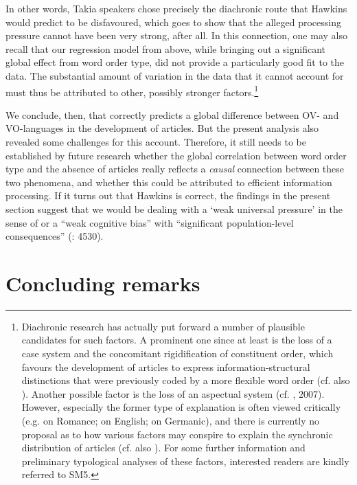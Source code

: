 \documentclass[output=paper]{langsci/langscibook}
\begin{document}
In other words, Takia speakers chose precisely the diachronic route that Hawkins would predict to be disfavoured, which goes to show that the alleged processing pressure cannot have been very strong, after all. In this connection, one may also recall that our regression model from above, while bringing out a significant global effect from word order type, did not provide a particularly good fit to the data. The substantial amount of variation in the data that it cannot account for must thus be attributed to other, possibly stronger factors.\footnote{Diachronic research has actually put forward a number of plausible candidates for such factors. A prominent one since at least \citet{Vennemann1975} is the loss of a case system and the concomitant rigidification of constituent order, which favours the development of articles to express information-structural distinctions that were previously coded by a more flexible word order (cf. also \citealt{Hawkins2004,HewsonBubenik2006,Fischer2010,CarlierLamiroy2014}). Another possible factor is the loss of an aspectual system (cf. \citealt{Abraham1997,Leiss2000}, 2007). However, especially the former type of explanation is often viewed critically (e.g. \citealt{Selig1992} on Romance;  \citealt{McCollMillar2000} on English; \citealt{Leiss2000} on Germanic), and there is currently no proposal as to how various factors may conspire to explain the synchronic distribution of articles (cf. also \citealt{Lüdtke1991}). For some further information and preliminary typological analyses of these factors, interested readers are kindly referred to SM5.}

We conclude, then, that \citet{Hawkins2014} correctly predicts a global difference between OV- and VO-languages in the development of articles. But the present analysis also revealed some challenges for this account. Therefore, it still needs to be established by future research whether the global correlation between word order type and the absence of articles really reflects a \textit{causal} connection between these two phenomena, and whether this could be attributed to efficient information processing. If it turns out that Hawkins is correct, the findings in the present section suggest that we would be dealing with a ‘weak universal pressure’ in the sense of  or a “weak cognitive bias” with “significant population-level consequences” (\citealt{ThompsonEtAl2016}: 4530).

\section{ Concluding remarks} 
\end{document}
